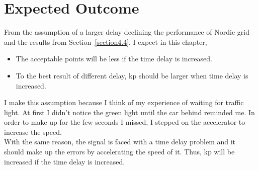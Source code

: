 \section{Expected Outcome} %
\label{section5.2}
From the assumption of a larger delay declining the performance of Nordic grid and the results from Section~\ref{section4.4}, I expect in this chapter,\\

\begin{itemize}
    \item The acceptable points will be less if the time delay is increased. \\
    \item To the best result of different delay, kp should be larger when time delay is increased. \\
\end{itemize}


I make this assumption because I think of my experience of waiting for traffic light. At first I didn't notice the green light until the car behind reminded me. In order to make up for the few seconds I missed, I stepped on the accelerator to increase the speed.\\ 

With the same reason, the signal is faced with a time delay problem and it should make up the errors by accelerating the speed of it. Thus, kp will be increased if the time delay is increased. \\